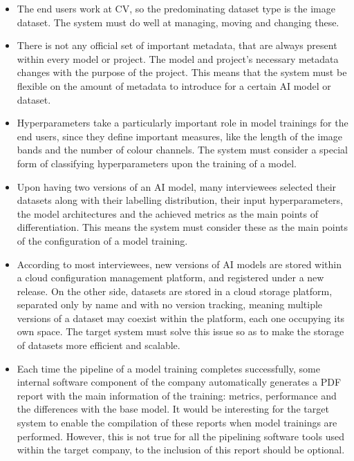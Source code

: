 \begin{itemize}
    \item The end users work at \acrshort{CV}, so the predominating dataset type is the image dataset. The system must do well at managing, moving and changing these.

    \item There is not any official set of important metadata, that are always present within every model or project. The model and project's necessary metadata changes with
    the purpose of the project. This means that the system must be flexible on the amount of metadata to introduce for a certain \acrshort{AI} model or dataset.

    \item Hyperparameters take a particularly important role in model trainings for the end users, since they define important measures, like the length of the image bands and
    the number of colour channels. The system must consider a special form of classifying hyperparameters upon the training of a model.

    \item Upon having two versions of an \acrshort{AI} model, many interviewees selected their datasets along with their labelling distribution, their input hyperparameters, 
    the model architectures and the achieved metrics as the main points of differentiation. This means the system must consider these as the main points of the configuration
    of a model training.

    \item According to most interviewees, new versions of \acrshort{AI} models are stored within a cloud configuration management platform, and registered under a new release. On
    the other side, datasets are stored in a cloud storage platform, separated only by name and with no version tracking, meaning multiple versions of a dataset may coexist within
    the platform, each one occupying its own space. The target system must solve this issue so as to make the storage of datasets more efficient and scalable.

    \item Each time the pipeline of a model training completes successfully, some internal software component of the company automatically generates a PDF report with the main information
    of the training: metrics, performance and the differences with the base model. It would be interesting for the target system to enable the compilation of these reports when model
    trainings are performed. However, this is not true for all the pipelining software tools used within the target company, to the inclusion of this report should be optional.


\end{itemize}
